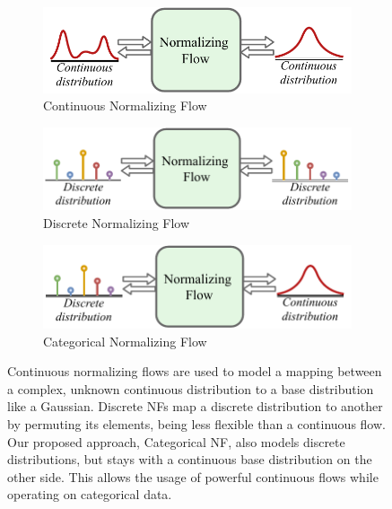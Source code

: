 \begin{figure}[b!]
    \centering
    \begin{subfigure}{.48\textwidth}
        \centering
        \includegraphics[width=\linewidth]{figures/intro_figures/GeneralNFs_Continuous_to_Continuous.pdf}
        \caption{Continuous Normalizing Flow}
        \label{fig:introduction_NFs_continuous_to_continuous}
    \end{subfigure}
    \hfill
    \begin{subfigure}{.48\textwidth}
        \centering
        \includegraphics[width=\linewidth]{figures/intro_figures/GeneralNFs_Discrete_to_Discrete.pdf}
        \caption{Discrete Normalizing Flow}
        \label{fig:introduction_NFs_discrete_to_discrete}
    \end{subfigure}
    \begin{subfigure}{.48\textwidth}
        \centering
        \includegraphics[width=\linewidth]{figures/intro_figures/GeneralNFs_Discrete_to_Continuous.pdf}
        \caption{Categorical Normalizing Flow}
        \label{fig:introduction_NFs_discrete_to_continuous}
    \end{subfigure}
    \caption[Comparison of Continuous, Discrete and Categorical Normalizing Flows]{
    Continuous normalizing flows are used to model a mapping between a complex, unknown continuous distribution to a base distribution like a Gaussian. 
    Discrete NFs map a discrete distribution to another by permuting its elements, being less flexible than a continuous flow.
    Our proposed approach, Categorical NF, also models discrete distributions, but stays with a continuous base distribution on the other side. This allows the usage of powerful continuous flows while operating on categorical data.}
    \label{fig:introduction_NFs_concept_semi_discrete}
\end{figure}

